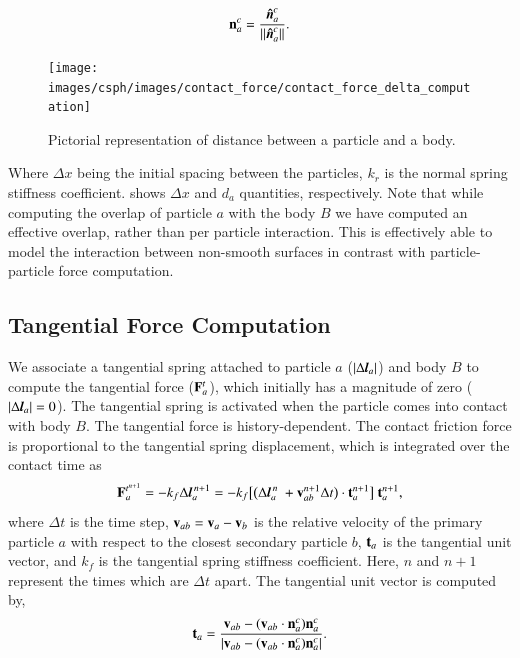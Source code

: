 \begin{equation}
  \label{eq:cf-normal-vector}
  \mathbf{n}_a^{c} = \frac{\boldsymbol{\hat{n}}_a^{c}}{||\boldsymbol{\hat{n}}_a^{c}||}.
\end{equation}
\begin{figure}[!htpb]
  \centering
  \texttt{[image: images/csph/images/contact\_force/contact\_force\_delta\_computation]}
  \caption{Pictorial representation of distance between a particle and a body.}
\label{fig:contact_force_delta_computation}
\end{figure}
Where $\Delta x$ being the initial spacing between the particles, $k_r$ is the
normal spring stiffness coefficient. 
shows $\Delta x$ and $d_a$ quantities, respectively. Note that while computing
the overlap of particle $a$ with the body $B$ we have computed an effective
overlap, rather than per particle interaction. This is effectively able to model
the interaction between non-smooth surfaces in contrast with particle-particle
force computation.

\subsection{Tangential Force Computation}
\label{sec:tangential-force-computation}
We associate a tangential spring attached to particle $a$
($|\Delta \textit{\textbf{l}}_a|$) and body $B$ to compute the tangential force
($\mathbf{F}_{a}^{t}$), which initially has a magnitude of zero
($|\Delta \textit{\textbf{l}}_a|=0$). The tangential spring is activated when
the particle comes into contact with body $B$. The tangential force is
history-dependent. The contact friction force is proportional to the tangential
spring displacement, which is integrated over the contact time as
\begin{equation}
  \label{eq:tangential-force}
  \mathbf{F}_{a}^{t^{n+1}} =
  -k_f \Delta \textit{\textbf{l}}_a^{\,n + 1} =
  -k_f \big[\big(\Delta {\textit{\textbf{l}}}_a^{\,n} \
  + \mathbf{v}_{ab}^{n + 1} \Delta t\big) \cdot \mathbf{t}_a^{n + 1} \big] \
  \mathbf{t}_a^{n + 1},
\end{equation}
where $\Delta t$ is the time step, $\mathbf{v}_{ab} = \mathbf{v}_{a} - \mathbf{v}_b$ is
the relative velocity of the primary particle $a$ with respect to the closest
secondary particle $b$, $\mathbf{t}_a$ is the tangential unit vector, and $k_f$ is the tangential spring stiffness
coefficient. Here, $n$ and $n+1$ represent the times which are $\Delta t$ apart.
The tangential unit vector is computed by,
\begin{equation}
  \label{eq:tangential-vect}
  \mathbf{t}_a = \frac{\mathbf{v}_{ab} - (\mathbf{v}_{ab} \cdot \mathbf{n}_a^{c}) \mathbf{n}_a^{c}}{|\mathbf{v}_{ab} - (\mathbf{v}_{ab} \cdot \mathbf{n}_a^{c}) \mathbf{n}_a^{c}|}.
\end{equation}

